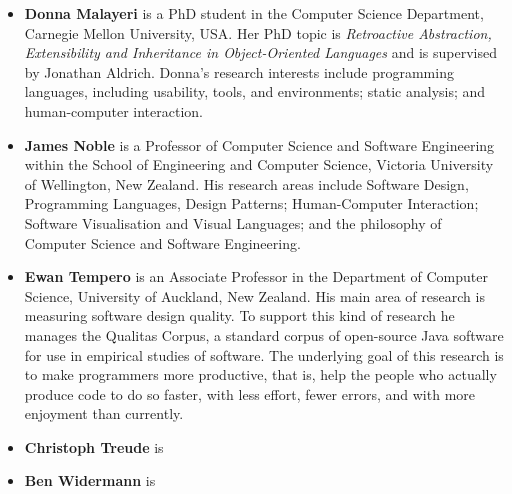 \documentclass[authorpermission]{sigplanconf}
\begin{document}
\begin{itemize}



\item \textbf{Donna Malayeri} is a PhD student in the Computer Science
  Department, Carnegie Mellon University, USA. Her PhD topic is
  \emph{Retroactive Abstraction, Extensibility and Inheritance in
    Object-Oriented Languages} and is supervised by Jonathan
  Aldrich. Donna's research interests include programming languages,
  including usability, tools, and environments; static analysis; and
  human-computer interaction.

\item \textbf{James Noble} is a Professor of Computer Science and
  Software Engineering within the School of Engineering and Computer
  Science, Victoria University of Wellington, New Zealand.  His
  research areas include Software Design, Programming Languages,
  Design Patterns; Human-Computer Interaction; Software Visualisation
  and Visual Languages; and the philosophy of Computer Science and
  Software Engineering. 

\item \textbf{Ewan Tempero} is an Associate Professor in the
  Department of Computer Science, University of Auckland, New
  Zealand. His main area of research is measuring software design
  quality. To support this kind of research he manages the Qualitas
  Corpus, a standard corpus of open-source Java software for use in
  empirical studies of software. The underlying goal of this research
  is to make programmers more productive, that is, help the people who
  actually produce code to do so faster, with less effort, fewer
  errors, and with more enjoyment than currently.

\item \textbf{Christoph Treude} is

\item \textbf{Ben Widermann} is

\end{itemize}
\end{document}
